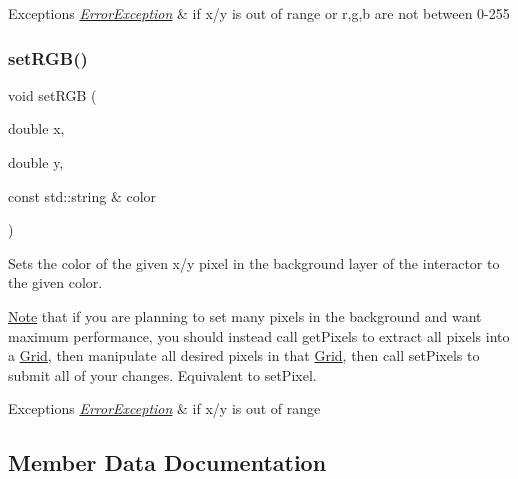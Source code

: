\begin{DoxyExceptions}{Exceptions}
{\em \mbox{\hyperlink{classErrorException}{Error\+Exception}}} & if x/y is out of range or r,g,b are not between 0-\/255 \\
\hline
\end{DoxyExceptions}
\mbox{\label{classGDrawingSurface_ae9a228792d4bb4b628350f39eaa3ad12}} 
\subsubsection{\texorpdfstring{set\+R\+G\+B()}{setRGB()}\hspace{0.1cm}{\footnotesize\ttfamily [3/3]}}
{\footnotesize\ttfamily void set\+R\+GB (\begin{DoxyParamCaption}\item[{double}]{x,  }\item[{double}]{y,  }\item[{const std\+::string \&}]{color }\end{DoxyParamCaption})\hspace{0.3cm}{\ttfamily [virtual]}}



Sets the color of the given x/y pixel in the background layer of the interactor to the given color. 

\mbox{\hyperlink{classNote}{Note}} that if you are planning to set many pixels in the background and want maximum performance, you should instead call get\+Pixels to extract all pixels into a \mbox{\hyperlink{classGrid}{Grid}}, then manipulate all desired pixels in that \mbox{\hyperlink{classGrid}{Grid}}, then call set\+Pixels to submit all of your changes. Equivalent to set\+Pixel.


\begin{DoxyExceptions}{Exceptions}
{\em \mbox{\hyperlink{classErrorException}{Error\+Exception}}} & if x/y is out of range \\
\hline
\end{DoxyExceptions}


\subsection{Member Data Documentation}
\mbox{\label{classGDrawingSurface_a738dd6afc69ac536ad46cf4d89a90933}} 
